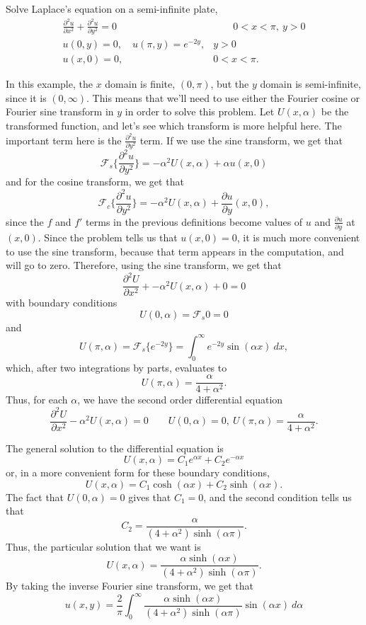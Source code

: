 \begin{example}
Solve Laplace's equation on a semi-infinite plate,
\[
\begin{split}
\frac{\partial^2 u}{\partial x^2} + \frac{\partial^2 u}{\partial y^2} = 0 & \qquad 0 < x < \pi,\ y > 0 \\
u(0, y) = 0, \quad u(\pi, y) = e^{-2y}, & y > 0 \\
u(x, 0) = 0, & 0 < x < \pi. 
\end{split}
\]
\end{example}

\begin{exampleSol}
In this example, the $x$ domain is finite, $(0, \pi)$, but the $y$ domain is semi-infinite, since it is $(0, \infty)$. This means that we'll need to use either the Fourier cosine or Fourier sine transform in $y$ in order to solve this problem. Let $U(x, \alpha)$ be the transformed function, and let's see which transform is more helpful here. The important term here is the $\frac{\partial^2 u}{\partial y^2}$ term. If we use the sine transform, we get that
\[ \mathcal{F}_s\{\frac{\partial^2 u}{\partial y^2}\} = -\alpha^2 U(x, \alpha) + \alpha u(x,0) \] and for the cosine transform, we get that
 \[ \mathcal{F}_c\{\frac{\partial^2 u}{\partial y^2}\} = -\alpha^2 U(x, \alpha) +  \frac{\partial u}{\partial y}(x,0), \] since the $f$ and $f'$ terms in the previous definitions become values of $u$ and $\frac{\partial u}{\partial y}$ at $(x,0)$. Since the problem tells us that $u(x,0) = 0$, it is much more convenient to use the sine transform, because that term appears in the computation, and will go to zero. Therefore, using the sine transform, we get that
\[ \frac{\partial^2 U}{\partial x^2} + -\alpha^2 U(x, \alpha) + 0 = 0 \] with boundary conditions
\[ U(0, \alpha) = \mathcal{F}_s{0} = 0 \] and 
\[ U(\pi, \alpha) = \mathcal{F}_s\{e^{-2y}\} = \int_0^\infty e^{-2y}\sin(\alpha x) \ dx, \]
which, after two integrations by parts, evaluates to
\[ U(\pi, \alpha) = \frac{\alpha}{4+\alpha^2}.\] Thus, for each $\alpha$, we have the second order differential equation
\[  \frac{\partial^2 U}{\partial x^2}  -\alpha^2 U(x, \alpha) = 0 \qquad U(0, \alpha) = 0,\ U(\pi, \alpha) = \frac{\alpha}{4 + \alpha^2} .\]

The general solution to the differential equation is
\[ U(x, \alpha) = C_1e^{\alpha x} + C_2 e^{-\alpha x} \] or, in a more convenient form for these boundary conditions,
\[ U(x, \alpha) = C_1 \cosh(\alpha x) + C_2 \sinh(\alpha x). \] The fact that $U(0, \alpha) = 0$ gives that $C_1 = 0$, and the second condition tells us that
\[ C_2 = \frac{\alpha}{(4 + \alpha^2)\sinh(\alpha \pi)}. \] Thus, the particular solution that we want is 
\[ U(x, \alpha) = \frac{\alpha \sinh(\alpha x)}{(4 + \alpha^2)\sinh(\alpha \pi)}. \] By taking the inverse Fourier sine transform, we get that
\[ u(x,y) = \frac{2}{\pi} \int_0^\infty \frac{\alpha \sinh(\alpha x)}{(4 + \alpha^2)\sinh(\alpha \pi)} \sin(\alpha x)\ d\alpha  \]
\end{exampleSol}


